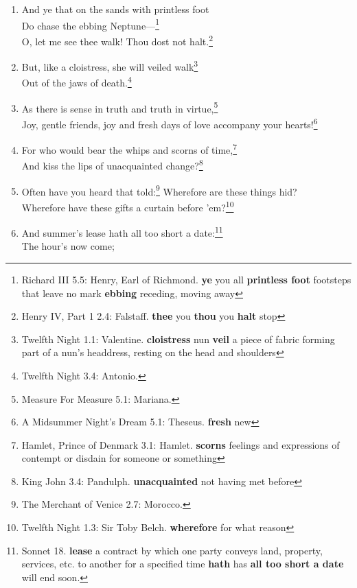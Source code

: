 \documentclass[17pt,twoside]{extarticle}
\begin{document}
\begin{enumerate}
{    Denmark 3.1: Hamlet. \textbf{dread} anticipate with great
    apprehension or fear}\\It droppeth as the gentle rain from
  heaven.\footnote{The Merchant of Venice 4.1: Portia. She speaks of the
    quality of mercy. \textbf{droppeth} drops}
\item
  And ye that on the sands with printless foot\\Do chase the ebbing
  Neptune---\footnote{Richard III 5.5: Henry, Earl of Richmond.
    \textbf{ye} you all \textbf{printless foot} footsteps that leave no
    mark \textbf{ebbing} receding, moving away}\\O, let me see thee
  walk! Thou dost not halt.\footnote{Henry IV, Part 1 2.4: Falstaff.
    \textbf{thee} you \textbf{thou} you \textbf{halt} stop}
\item
  But, like a cloistress, she will veiled walk\footnote{Twelfth Night
    1.1: Valentine. \textbf{cloistress} nun \textbf{veil} a piece of
    fabric forming part of a nun's headdress, resting on the head and
    shoulders}\\Out of the jaws of death.\footnote{Twelfth Night 3.4:
    Antonio.}
\item
  As there is sense in truth and truth in virtue,\footnote{Measure For
    Measure 5.1: Mariana.}\\Joy, gentle friends, joy and fresh days of
  love accompany your hearts!\footnote{A Midsummer Night's Dream 5.1:
    Theseus. \textbf{fresh} new}
\item
  For who would bear the whips and scorns of time,\footnote{Hamlet,
    Prince of Denmark 3.1: Hamlet. \textbf{scorns} feelings and
    expressions of contempt or disdain for someone or something}\\And
  kiss the lips of unacquainted change?\footnote{King John 3.4:
    Pandulph. \textbf{unacquainted} not having met before}
\item
  Often have you heard that told:\footnote{The Merchant of Venice 2.7:
    Morocco.} Wherefore are these things hid?\\Wherefore have these
  gifts a curtain before 'em?\footnote{Twelfth Night 1.3: Sir Toby
    Belch. \textbf{wherefore} for what reason}
\item
  And summer's lease hath all too short a date:\footnote{Sonnet 18.
    \textbf{lease} a contract by which one party conveys land, property,
    services, etc. to another for a specified time \textbf{hath} has
    \textbf{all too short a date} will end soon.}\\The hour's now come;

\end{enumerate}
\end{document}
